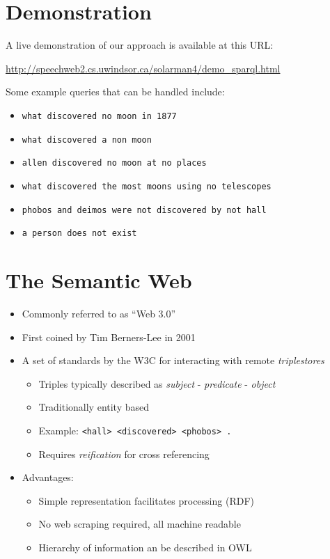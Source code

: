 \documentclass[logoontitle,tabu,supertabular,aspectratio=43]{preney-uwindsor-beamer}
\begin{document}


	\section{Demonstration}
	\begin{frame}{\insertsection}
		A live demonstration of our approach is available at this URL:
		\begin{center}
			\url{http://speechweb2.cs.uwindsor.ca/solarman4/demo_sparql.html}
		\end{center}
		Some example queries that can be handled include:
		\begin{itemize}
			\item \texttt{what discovered no moon in 1877}
			\item \texttt{what discovered a non moon}
			\item \texttt{allen discovered no moon at no places}
			\item \texttt{what discovered the most moons using no telescopes}
			\item \texttt{phobos and deimos were not discovered by not hall}
			\item \texttt{a person does not exist}
		\end{itemize}
	\end{frame}

	\section{The Semantic Web}
	\begin{frame}{\insertsection}
		\begin{itemize}
			\item Commonly referred to as ``Web 3.0''
			\item First coined by Tim Berners-Lee in 2001 \cite{berners2001semantic}
			\item A set of standards by the W3C for interacting with remote {\em triplestores} \cite{w3csemanticweb}
			\begin{itemize}
				\item Triples typically described as {\em subject} - {\em predicate} - {\em object}
				\item Traditionally entity based
				\item Example: \texttt{<hall> <discovered> <phobos> .}
				\item Requires {\em reification} for cross referencing
			\end{itemize}
			\item Advantages:
			\begin{itemize}
				\item Simple representation facilitates processing (RDF) \cite{w3c}
				\item No web scraping required, all machine readable
				\item Hierarchy of information an be described in OWL \cite{mcguinness2004owl}
			\end{itemize}
		\end{itemize}
	\end{frame}
\end{document}
